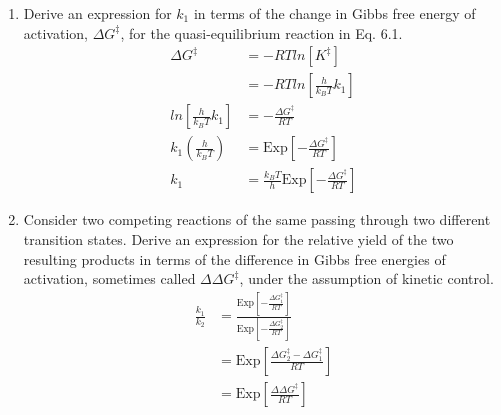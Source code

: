 \documentclass{article}
\begin{document}
\begin{enumerate}
	\item Derive an expression for $k_1$ in terms of the change in Gibbs free energy of activation, $\Delta G^\ddag$, for the quasi-equilibrium reaction in Eq. 6.1.
	\begin{equation*}
	\begin{split}
		\Delta G^\ddag & = - R T ln[ K^\ddag ] \\ 
		& = - R T ln[ \frac{h}{k_B T} k_1 ] \\
		ln[ \frac{h}{k_B T} k_1 ] & = - \frac{\Delta G^\ddag}{R T} \\
		k_1 ( \frac{h}{k_B T} ) & = \text{Exp}[ - \frac{\Delta G^\ddag}{R T} ] \\
		k_1 & = \frac{k_B T}{h} \text{Exp}[ - \frac{\Delta G^\ddag}{R T} ] 
	\end{split}
	\end{equation*}

	\item Consider two competing reactions of the same passing through two different transition states.
	Derive an expression for the relative yield of the two resulting products in terms of the difference in Gibbs free energies of activation, sometimes called $\Delta \Delta G^\ddag$, under the assumption of kinetic control.
	\begin{equation*}
	\begin{split}
		\frac{k_1}{k_2} & = \frac{\text{Exp}[ - \frac{\Delta G_1^\ddag}{R T} ]}{\text{Exp}[ - \frac{\Delta G_2^\ddag}{R T} ]} \\
		& = \text{Exp}[ \frac{\Delta G_2^\ddag - \Delta G_1^\ddag}{R T} ] \\
		& = \text{Exp}[ \frac{\Delta \Delta G^\ddag}{R T} ]  
	\end{split}
	\end{equation*}
\end{enumerate}
\end{document}
